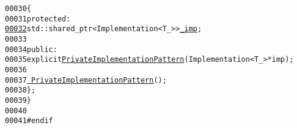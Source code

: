 \begin{footnotesize}
\begin{alltt}
00030     \{
00031         \textcolor{keyword}{protected}:
\hypertarget{private__implementation__pattern_8hh_source_l00032}{}\hyperlink{classeos_1_1PrivateImplementationPattern_a232940e78b26c6ed4f97196f831c69c9}{00032}             std::shared\_ptr<Implementation<T\_> > \hyperlink{classeos_1_1PrivateImplementationPattern_a232940e78b26c6ed4f97196f831c69c9}{_imp};
00033 
00034         \textcolor{keyword}{public}:
00035             \textcolor{keyword}{explicit} \hyperlink{classeos_1_1PrivateImplementationPattern_a3e3d5f4a565256a1dda6c234b051b2f2}{PrivateImplementationPattern}(Implementation<T\_> * imp);
00036 
00037             \hyperlink{classeos_1_1PrivateImplementationPattern_acf46ec2739c3b0ec9702b9428475876d}{~PrivateImplementationPattern}();
00038     \};
00039 \}
00040 
00041 \textcolor{preprocessor}{#endif}
\end{alltt}\end{footnotesize}
